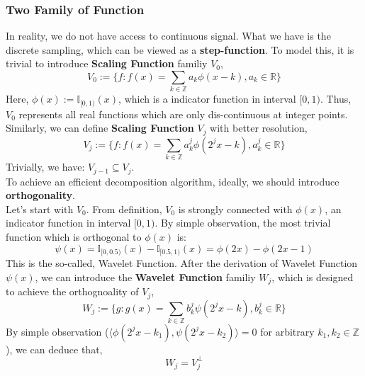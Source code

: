 \documentclass{article}
\begin{document}
\subsubsection{Two Family of Function}
In reality, we do not have access to continuous signal. What we have is the discrete sampling, which can be viewed as a \textbf{step-function}. To model this, it is trivial to introduce \textbf{Scaling Function} familiy $V_0$,
\begin{equation}
	V_0 := \{f: f(x) = \sum_{k\in \mathbb{Z}}a_k\phi(x-k),a_k\in \mathbb{R}\}
\end{equation}
Here, $\phi(x):= \mathbb{I}_{[0,1)}(x)$, which is a indicator function in interval $[0,1)$. Thus, $V_0$ represents all real functions which are only dis-continuous at integer points.
\vspace{4pt}
\\
Similarly, we can define \textbf{Scaling Function} $V_j$ with better resolution,
\begin{equation}
	V_j := \{f: f(x) = \sum_{k\in \mathbb{Z}}a^j_k\phi(2^jx-k),a^j_k\in \mathbb{R}\}
\end{equation}
Trivially, we have: $V_{j-1} \subseteq V_j$.
\vspace{4pt}
\\
To achieve an efficient decomposition algorithm, ideally, we should introduce \textbf{orthogonality}. 
\vspace{4pt}
\\
Let's start with $V_0$. From definition, $V_0$ is strongly connected with $\phi(x)$, an indicator function in interval $[0,1)$. By simple observation, the most trivial function which is orthogonal to $\phi(x)$ is:
\begin{equation}
	\psi(x)= \mathbb{I}_{[0,0.5)}(x) - \mathbb{I}_{[0.5,1)}(x) = \phi(2x)-\phi(2x-1)
\end{equation}
This is the so-called, Wavelet Function. After the derivation of Wavelet Function $\psi(x)$, we can introduce the \textbf{Wavelet Function} familiy $W_j$, which is designed to achieve the orthognoality of $V_j$,
\begin{equation}
	W_j := \{g: g(x) = \sum_{k\in \mathbb{Z}}b^j_k\psi(2^jx-k),b^j_k\in \mathbb{R}\}
\end{equation}
By simple observation ($\langle \phi(2^jx-k_1), \psi(2^jx-k_2) \rangle = 0$ for arbitrary $k_1, k_2 \in \mathbb{Z}$), we can deduce that,
\begin{equation}
	W_j = V_j^{\bot}
\end{equation}
\newpage
\end{document}
